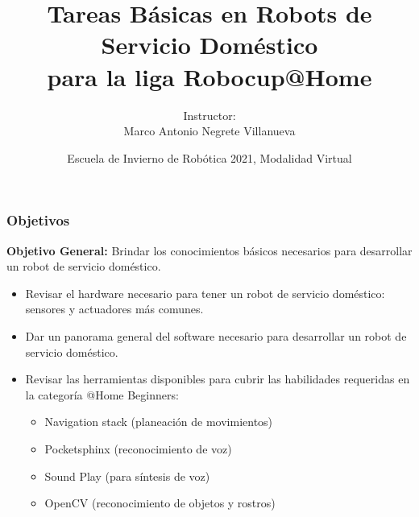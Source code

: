 \documentclass[10pt,spanish,aspectratio=1610]{beamer}
\begin{document}
\renewcommand{\tablename}{Tabla}
\renewcommand{\figurename}{Figura}

\title[Robocup@Home Basic Tasks]{Tareas Básicas en Robots de Servicio Doméstico\\para la liga Robocup@Home}
\author[Marco Negrete]{Instructor: \\ Marco Antonio Negrete Villanueva}
\date[EIR 2021]{Escuela de Invierno de Robótica 2021, Modalidad Virtual}

\begin{frame}
\titlepage
\end{frame}

\begin{frame}\frametitle{Objetivos}
  \textbf{Objetivo General:} Brindar los conocimientos básicos necesarios para desarrollar un robot de servicio doméstico. 
  \begin{itemize}
  \item Revisar el hardware necesario para tener un robot de servicio doméstico: sensores y actuadores más comunes.
  \item Dar un panorama general del software necesario para desarrollar un robot de servicio doméstico.
  \item Revisar las herramientas disponibles para cubrir las habilidades requeridas en la categoría @Home Beginners:
    \begin{itemize}
    \item Navigation stack (planeación de movimientos)
    \item Pocketsphinx (reconocimiento de voz)
    \item Sound Play (para síntesis de voz)
    \item OpenCV (reconocimiento de objetos y rostros)
    \end{itemize}
  \end{itemize}
\end{frame}

\end{document}
